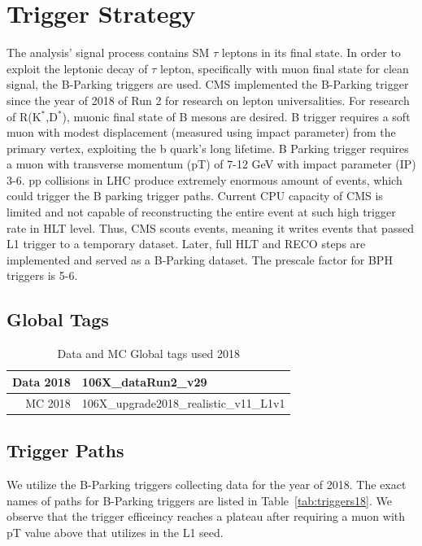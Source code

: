 \clearpage
\chapter{Trigger Strategy}\label{sec:triggers}

The analysis' signal process contains SM $\tau$ leptons in its final state. 
In order to exploit the leptonic decay of $\tau$ lepton, specifically with muon final state for clean signal, the B-Parking triggers are used. 
CMS implemented the B-Parking trigger since the year of 2018 of Run 2 for research on lepton universalities. 
For research of R(K$^{*}$,D$^{*}$), muonic final state of B mesons are desired. 
B trigger requires a soft muon with modest displacement (measured using impact parameter) from the primary vertex, exploiting the b quark's long lifetime.
B Parking trigger requires a muon with transverse momentum (pT) of 7-12 GeV with impact parameter (IP) 3-6.
pp collisions in LHC produce extremely enormous amount of events, which could trigger the B parking trigger paths. 
Current CPU capacity of CMS is limited and not capable of reconstructing the entire event at such high trigger rate in HLT level.
Thus, CMS scouts events, meaning it writes events that passed L1 trigger to a temporary dataset. Later, full HLT and RECO steps are implemented and served as a B-Parking dataset. 
The prescale factor for BPH triggers is 5-6.


\section{Global Tags}
\begin{table}[htb]
\caption{Data and MC Global tags used 2018}
\begin{center}
\begin{tabular}{r|l}\hline
 Data 2018 & 106X\_dataRun2\_v29 \\
 \hline
 MC 2018   & 106X\_upgrade2018\_realistic\_v11\_L1v1 \\
 \hline
\end{tabular}
\label{tab:GT}
\end{center}
\end{table}


\section{Trigger Paths}
We utilize the B-Parking triggers collecting data for the year of 2018.
The exact names of paths for B-Parking triggers are listed in Table~\ref{tab:triggers18}.
We observe that the trigger efficeincy reaches a plateau after requiring a muon with pT value above that utilizes in the L1 seed.

